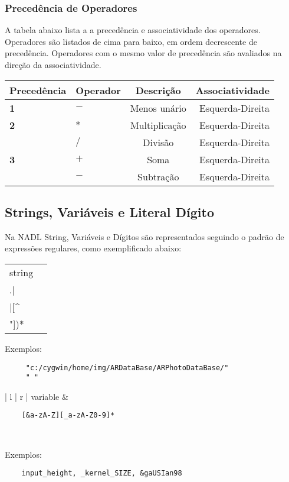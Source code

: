 \documentclass[a4paper,10pt]{article}
\begin{document}
		\subsubsection{Preced\^encia de Operadores}
		A tabela abaixo lista a a preced\^encia e associatividade dos operadores. Operadores s\~ao listados de cima para baixo, em ordem decrescente de preced\^encia. Operadores com o mesmo valor de preced\^encia
		s\~ao avaliados na dire\c{c}\~ao da associatividade.
		\begin{center}
		\begin{tabular}{| l | l | c | r |}
		  \hline
			{\bf Preced\^encia} & {\bf Operador} & {\bf Descri\c{c}\~ao} & {\bf Associatividade} \\
			\hline
			{\bf 1} & $-$ & Menos un\'ario & Esquerda-Direita \\
			\hline
			{\bf 2} & $*$ & Multiplica\c{c}\~ao & Esquerda-Direita \\
				& $/$ & Divis\~ao & Esquerda-Direita \\
			\hline
			{\bf 3} & $+$ & Soma & Esquerda-Direita \\
				& $-$ & Subtra\c{c}\~ao & Esquerda-Direita \\
		  \hline
		\end{tabular}
		\end{center}

	\subsection{Strings, Vari\'aveis e Literal D\'igito}
	Na NADL String, Vari\'aveis e D\'igitos s\~ao representados seguindo o padr\~ao de express\~oes regulares, como exemplificado abaixo:

	\begin{center}
	 \begin{tabular}{| l | r |}
	  \hline
		string & \begin{lstlisting} 
	\"(\\.|\\\n|[^\\"])*\"
	\end{lstlisting}\\
	  \hline
	 \end{tabular}
	\end{center}
	Exemplos:
	\begin{lstlisting}
	 "c:/cygwin/home/img/ARDataBase/ARPhotoDataBase/"
	 " " 
	\end{lstlisting}

	\begin{center}
	 \begin{tabular}{| l | r |}
	  \hline
		variable & \begin{lstlisting} 
	[&a-zA-Z][_a-zA-Z0-9]*
	\end{lstlisting}\\
	  \hline
	 \end{tabular}
	\end{center}
	Exemplos:
	\begin{lstlisting}
	input_height, _kernel_SIZE, &gaUSIan98
	\end{lstlisting}
\end{document}
